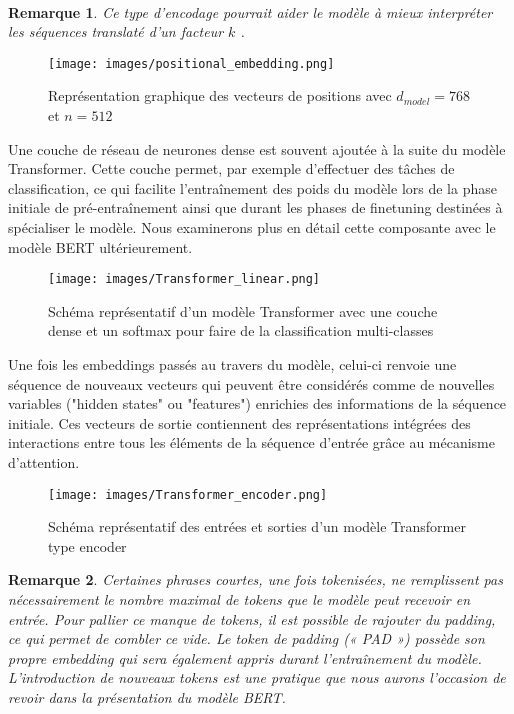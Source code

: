 \documentclass[12pt]{article}
\newtheorem{rmq}{Remarque}
\theoremstyle{definition}
\begin{document}
\hfill \\

\begin{rmq}
	Ce type d’encodage pourrait aider le modèle à mieux interpréter les séquences translaté d'un facteur $k$ \cite{a_i_a_y_n}.
\end{rmq}

\newpage 
\begin{figure*}[!h]
	\centering
	\texttt{[image: images/positional\_embedding.png]}
	\caption{Représentation graphique des vecteurs de positions avec $d_{model} = 768$ et $n=512$}
\end{figure*}




Une couche de réseau de neurones dense est souvent ajoutée à la suite du modèle Transformer. Cette couche permet, par exemple d'effectuer des tâches de classification, ce qui facilite l'entraînement des poids du modèle lors de la phase initiale de pré-entraînement ainsi que durant les phases de finetuning destinées à spécialiser le modèle. Nous examinerons plus en détail cette composante avec le modèle BERT ultérieurement.


\begin{figure*}[!h]
	\centering
	\texttt{[image: images/Transformer\_linear.png]}
	\caption{Schéma représentatif d'un modèle Transformer avec une couche dense et un softmax pour faire de la classification multi-classes}
\end{figure*}
 

\newpage 


Une fois les embeddings passés au travers du modèle, celui-ci renvoie une séquence de nouveaux vecteurs qui peuvent être considérés comme de nouvelles variables ("hidden states" ou "features") enrichies des informations de la séquence initiale. Ces vecteurs de sortie contiennent des représentations intégrées des interactions entre tous les éléments de la séquence d'entrée grâce au mécanisme d'attention.

\begin{figure*}[!h]
	\centering
	\texttt{[image: images/Transformer\_encoder.png]}
	\caption{Schéma représentatif des entrées et sorties d'un modèle Transformer type encoder}
\end{figure*}

\newpage

\begin{rmq}
	Certaines phrases courtes, une fois tokenisées, ne remplissent pas nécessairement le nombre maximal de tokens que le modèle peut recevoir en entrée. Pour pallier ce manque de tokens, il est possible de rajouter du padding, ce qui permet de combler ce vide. Le token de padding (« PAD ») possède son propre embedding qui sera également appris durant l'entraînement du modèle. L'introduction de nouveaux tokens est une pratique que nous aurons l'occasion de revoir dans la présentation du modèle BERT.   
\end{rmq}
\end{document}
